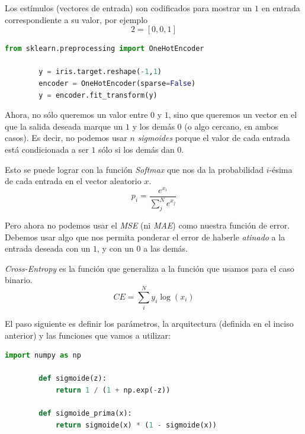 \documentclass[letterpaper,11pt]{article}
\begin{document}
\begin{enumerate}
\begin{enumerate}
        Los estímulos (vectores de entrada) son codificados para mostrar un $1$
        en entrada correspondiente a su valor, por ejemplo
        \begin{equation*}
            2 = [0, 0, 1]
        \end{equation*}

        \newpage
        \begin{lstlisting}[language=Python]
        from sklearn.preprocessing import OneHotEncoder

        y = iris.target.reshape(-1,1)
        encoder = OneHotEncoder(sparse=False)
        y = encoder.fit_transform(y)
        \end{lstlisting}

        Ahora, no sólo queremos un valor entre $0$ y $1$, sino que queremos un 
        vector en el que la salida deseada marque un $1$ y los demás $0$ (o 
        algo cercano, en ambos casos). Es decir, no podemos usar $n$ 
        \textit{sigmoides} porque el valor de cada entrada está condicionada a
        ser $1$ sólo si los demás dan $0$.

        Esto se puede lograr con la función \textit{Softmax} que nos da la 
        probabilidad $i$-ésima de cada entrada en el vector aleatorio $x$.
        \begin{equation*}
            p_i = \frac{e^{x_i}}{\sum_{j}^{N} e^{x_j}}
        \end{equation*}

        Pero ahora no podemos usar el \textit{MSE} (ni \textit{MAE}) como 
        nuestra función de error. Debemos usar algo que nos permita ponderar 
        el error de haberle \textit{atinado} a la entrada deseada con un $1$, y 
        con un $0$ a las demás.

        \textit{Cross-Entropy} es la función que generaliza a la función que 
        usamos para el caso binario.
        \begin{equation*}
            CE = \sum_{i}^{N} y_i \log (x_i)
        \end{equation*}

        El paso siguiente es definir los parámetros, la arquitectura (definida 
        en el inciso anterior) y las funciones que vamos a utilizar:
        \begin{lstlisting}[language=Python]
        import numpy as np

        def sigmoide(z):
            return 1 / (1 + np.exp(-z))

        def sigmoide_prima(x):
            return sigmoide(x) * (1 - sigmoide(x))


\end{lstlisting}
\end{enumerate}
\end{enumerate}
\end{document}
